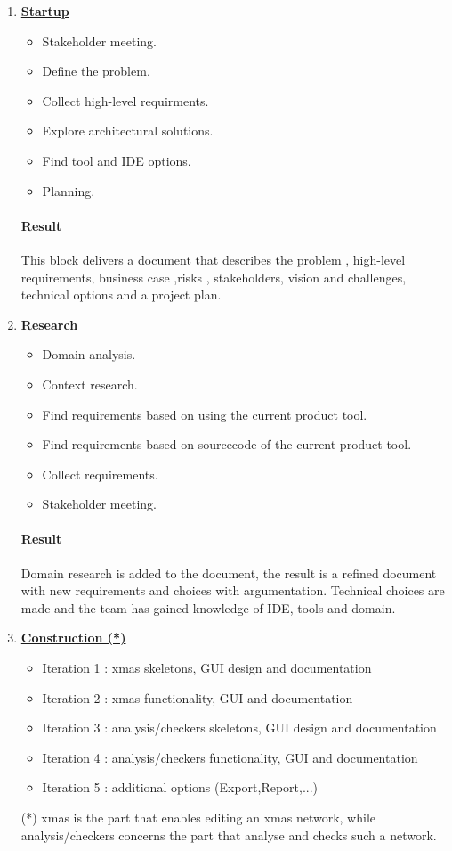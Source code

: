\begin{enumerate}
	\item \underline{\textbf{Startup}}
	\begin{itemize}
		\item Stakeholder meeting.
		\item Define the problem.
		\item Collect high-level requirments.
		\item Explore architectural solutions.
		\item Find tool and IDE options.
		\item Planning. 
	\end{itemize}
	\paragraph{Result}
	This block delivers a document that describes the problem , high-level requirements, business case ,risks , stakeholders, vision and challenges, technical options and a project plan.
	
	\item \underline{\textbf{Research}}
	\begin{itemize}
		\item Domain analysis.
		\item Context research.
		\item Find requirements based on using the current product tool.
		\item Find requirements based on sourcecode of the current product tool.
		\item Collect requirements.
		\item Stakeholder meeting.
	\end{itemize}
	\paragraph{Result}
	Domain research is added to the document, the result is a refined document with new requirements and choices with argumentation. Technical choices are made and the team has gained knowledge of IDE, tools and domain. 
	
	\item \underline{\textbf{Construction (*)}}

	\begin{itemize}
		\item Iteration 1 : 
			xmas skeletons, GUI design and documentation
		\item Iteration 2 : 
			xmas functionality, GUI and documentation
		\item Iteration 3 : 
			analysis/checkers skeletons, GUI design and documentation
		\item Iteration 4 : 
			analysis/checkers functionality, GUI and documentation
		\item Iteration 5 : 
			additional options (Export,Report,...)
	\end{itemize}
	(*) xmas is the part that enables editing an xmas network, while analysis/checkers concerns the part that analyse and checks such a network.
	

\end{enumerate}
